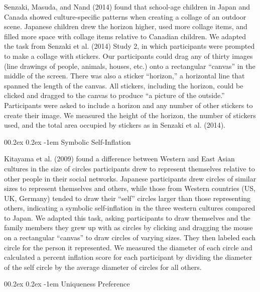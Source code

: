 \documentclass[
  man,floatsintext]{apa6}
\makeatletter
\let\oldparagraph\paragraph
\renewcommand{\paragraph}[1]{\oldparagraph{#1}\mbox{}}
\renewcommand{\paragraph}{\@startsection{paragraph}{4}{\parindent}%
  {0\baselineskip \@plus 0.2ex \@minus 0.2ex}%
  {-1em}%
  {\normalfont\normalsize\bfseries\itshape\typesectitle}}
\makeatother
\begin{document}
Senzaki, Masuda, and Nand (2014) found that school-age children in Japan and Canada showed culture-specific patterns when creating a collage of an outdoor scene. Japanese children drew the horizon higher, used more collage items, and filled more space with collage items relative to Canadian children. We adapted the task from Senzaki et al. (2014) Study 2, in which participants were prompted to make a collage with stickers. Our participants could drag any of thirty images (line drawings of people, animals, houses, etc.) onto a rectangular ``canvas'' in the middle of the screen. There was also a sticker ``horizon,'' a horizontal line that spanned the length of the canvas. All stickers, including the horizon, could be clicked and dragged to the canvas to produce ``a picture of the outside.'' Participants were asked to include a horizon and any number of other stickers to create their image. We measured the height of the horizon, the number of stickers used, and the total area occupied by stickers as in Senzaki et al. (2014).

\hypertarget{symbolic-self-inflation}{%
\paragraph{Symbolic Self-Inflation}\label{symbolic-self-inflation}}

Kitayama et al. (2009) found a difference between Western and East Asian cultures in the size of circles participants drew to represent themselves relative to other people in their social networks. Japanese participants drew circles of similar sizes to represent themselves and others, while those from Western countries (US, UK, Germany) tended to draw their ``self'' circles larger than those representing others, indicating a symbolic self-inflation in the three western cultures compared to Japan. We adapted this task, asking participants to draw themselves and the family members they grew up with as circles by clicking and dragging the mouse on a rectangular ``canvas'' to draw circles of varying sizes. They then labeled each circle for the person it represented. We measured the diameter of each circle and calculated a percent inflation score for each participant by dividing the diameter of the self circle by the average diameter of circles for all others.

\hypertarget{uniqueness-preference}{%
\paragraph{Uniqueness Preference}\label{uniqueness-preference}}
\end{document}
